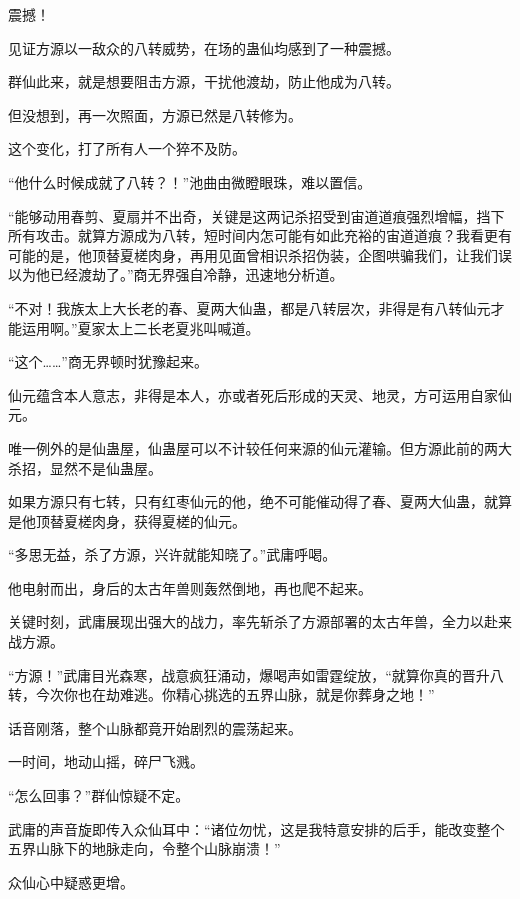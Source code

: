 
\begin{this_body}



震撼！

见证方源以一敌众的八转威势，在场的蛊仙均感到了一种震撼。

群仙此来，就是想要阻击方源，干扰他渡劫，防止他成为八转。

但没想到，再一次照面，方源已然是八转修为。

这个变化，打了所有人一个猝不及防。

“他什么时候成就了八转？！”池曲由微瞪眼珠，难以置信。

“能够动用春剪、夏扇并不出奇，关键是这两记杀招受到宙道道痕强烈增幅，挡下所有攻击。就算方源成为八转，短时间内怎可能有如此充裕的宙道道痕？我看更有可能的是，他顶替夏槎肉身，再用见面曾相识杀招伪装，企图哄骗我们，让我们误以为他已经渡劫了。”商无界强自冷静，迅速地分析道。

“不对！我族太上大长老的春、夏两大仙蛊，都是八转层次，非得是有八转仙元才能运用啊。”夏家太上二长老夏兆叫喊道。

“这个……”商无界顿时犹豫起来。

仙元蕴含本人意志，非得是本人，亦或者死后形成的天灵、地灵，方可运用自家仙元。

唯一例外的是仙蛊屋，仙蛊屋可以不计较任何来源的仙元灌输。但方源此前的两大杀招，显然不是仙蛊屋。

如果方源只有七转，只有红枣仙元的他，绝不可能催动得了春、夏两大仙蛊，就算是他顶替夏槎肉身，获得夏槎的仙元。

“多思无益，杀了方源，兴许就能知晓了。”武庸呼喝。

他电射而出，身后的太古年兽则轰然倒地，再也爬不起来。

关键时刻，武庸展现出强大的战力，率先斩杀了方源部署的太古年兽，全力以赴来战方源。

“方源！”武庸目光森寒，战意疯狂涌动，爆喝声如雷霆绽放，“就算你真的晋升八转，今次你也在劫难逃。你精心挑选的五界山脉，就是你葬身之地！”

话音刚落，整个山脉都竟开始剧烈的震荡起来。

一时间，地动山摇，碎尸飞溅。

“怎么回事？”群仙惊疑不定。

武庸的声音旋即传入众仙耳中：“诸位勿忧，这是我特意安排的后手，能改变整个五界山脉下的地脉走向，令整个山脉崩溃！”

众仙心中疑惑更增。


\end{this_body}
